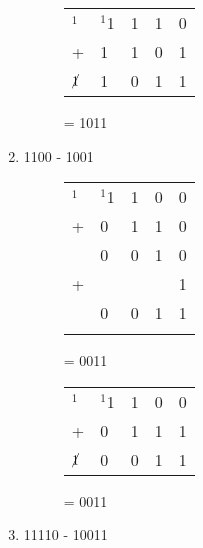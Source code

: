 \begin{enumerate}[label=(\alph*)]
\begin{figure}[H]
\begin{minipage}[t]{0.45\textwidth}
\begin{table}[H]
            \begin{tabularx}{0.5\textwidth}{XXXXX}
                $^1$& $^1$1 & 1 & 1 & 0\\
                + & 1 & 1 & 0 & 1\\
                \hline
                $\cancel{1}$ & 1 & 0 & 1 & 1 \\
                \hline
            \end{tabularx}
        \end{table}
        = 1011
    \end{minipage}\hfill
\end{figure}
\item 1100 - 1001
\begin{figure}[H]
    \begin{minipage}[t]{0.45\textwidth}
        \begin{table}[H]
            \begin{tabularx}{0.5\textwidth}{XXXXX}
                $^1$& $^1$1& 1 & 0 & 0\\
                + & 0 & 1& 1 & 0\\
                \hline
                & 0 & 0 & 1 & 0 \\
                + & & & &  1\\
                \hline
                & 0 & 0 & 1 & 1\\
                \hline
                &  & \\
            \end{tabularx}
        \end{table}
        = 0011
    \end{minipage}\hfill
    \begin{minipage}[t]{0.45\textwidth}
        \begin{table}[H]
            \begin{tabularx}{0.5\textwidth}{XXXXX}
                $^1$& $^1$1 & 1 & 0 & 0\\
                + & 0 & 1 & 1 & 1\\
                \hline
                $\cancel{1}$ & 0 & 0 & 1 & 1 \\
                \hline
            \end{tabularx}
        \end{table}
        = 0011
    \end{minipage}\hfill
\end{figure}
\item 11110 - 10011 %
\begin{figure}[H]

\end{figure}
\end{enumerate}
